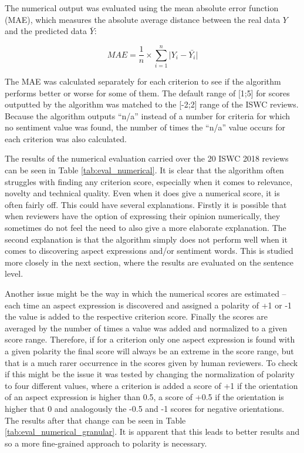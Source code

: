 The numerical output was evaluated using the mean absolute error function (MAE), which measures the absolute average distance between the real data $Y$ and the predicted data $\bar{Y}$:

\begin{equation}
MAE = \frac{1}{n} \times \sum_{i=1}^{n} \lvert Y_{i} - \bar{Y_{i}} \rvert
\end{equation}


The MAE was calculated separately for each criterion to see if the algorithm performs better or worse for some of them. The default range of [1;5] for scores outputted by the algorithm was matched to the [-2;2] range of the ISWC reviews. Because the algorithm outputs ``n/a'' instead of a number for criteria for which no sentiment value was found,  the number of times the ``n/a'' value occurs for each criterion was also calculated.

The results of the numerical evaluation carried over the 20 ISWC 2018 reviews can be seen in Table \ref{tab:eval_numerical}. It is clear that the algorithm often struggles with finding any criterion score, especially when it comes to relevance, novelty and technical quality. Even when it does give a numerical score, it is often fairly off. This could have several explanations. Firstly it is possible that when reviewers have the option of expressing their opinion numerically, they sometimes do not feel the need to also give a more elaborate explanation. The second explanation is that the algorithm simply does not perform well when it comes to discovering aspect expressions and/or sentiment words. This is studied more closely in the next section, where the results are evaluated on the sentence level. 

Another issue might be the way in which the numerical scores are estimated -- each time an aspect expression is discovered and assigned a polarity of +1 or -1 the value is added to the respective criterion score. Finally the scores are averaged by the number of times a value was added and normalized to a given score range. Therefore, if for a criterion only one aspect expression is found with a given polarity the final score will always be an extreme in the score range, but that is a much rarer occurrence in the scores given by human reviewers. To check if this might be the issue it was tested by changing the normalization of polarity to four different values, where a criterion is added a score of +1 if the orientation of an aspect expression is higher than 0.5, a score of +0.5 if the orientation is higher that 0 and analogously the -0.5 and -1 scores for negative orientations. The results after that change can be seen in Table \ref{tab:eval_numerical_granular}. It is apparent that this leads to better results and so a more fine-grained approach to polarity is necessary.



